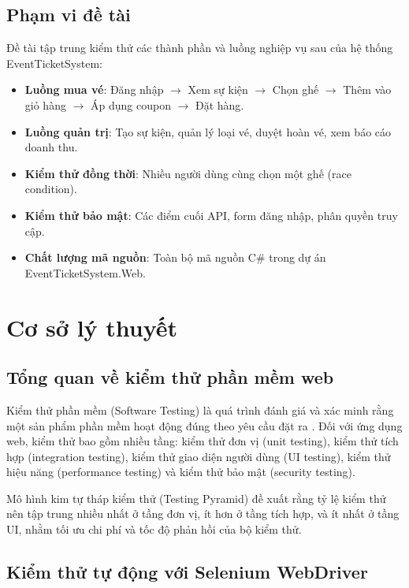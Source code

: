 \documentclass[../main.tex]{subfiles}
\begin{document}
\subsection{Phạm vi đề tài}

Đề tài tập trung kiểm thử các thành phần và luồng nghiệp vụ sau của hệ thống EventTicketSystem:

\begin{itemize}
    \item \textbf{Luồng mua vé}: Đăng nhập $\rightarrow$ Xem sự kiện $\rightarrow$ Chọn ghế $\rightarrow$ Thêm vào giỏ hàng $\rightarrow$ Áp dụng coupon $\rightarrow$ Đặt hàng.
    \item \textbf{Luồng quản trị}: Tạo sự kiện, quản lý loại vé, duyệt hoàn vé, xem báo cáo doanh thu.
    \item \textbf{Kiểm thử đồng thời}: Nhiều người dùng cùng chọn một ghế (race condition).
    \item \textbf{Kiểm thử bảo mật}: Các điểm cuối API, form đăng nhập, phân quyền truy cập.
    \item \textbf{Chất lượng mã nguồn}: Toàn bộ mã nguồn C\# trong dự án EventTicketSystem.Web.
\end{itemize}

\section{Cơ sở lý thuyết}

\subsection{Tổng quan về kiểm thử phần mềm web}

Kiểm thử phần mềm (Software Testing) là quá trình đánh giá và xác minh rằng một sản phẩm phần mềm hoạt động đúng theo yêu cầu đặt ra \cite{sommerville2016software}. Đối với ứng dụng web, kiểm thử bao gồm nhiều tầng: kiểm thử đơn vị (unit testing), kiểm thử tích hợp (integration testing), kiểm thử giao diện người dùng (UI testing), kiểm thử hiệu năng (performance testing) và kiểm thử bảo mật (security testing).

Mô hình kim tự tháp kiểm thử (Testing Pyramid) đề xuất rằng tỷ lệ kiểm thử nên tập trung nhiều nhất ở tầng đơn vị, ít hơn ở tầng tích hợp, và ít nhất ở tầng UI, nhằm tối ưu chi phí và tốc độ phản hồi của bộ kiểm thử.

\subsection{Kiểm thử tự động với Selenium WebDriver}
\end{document}
